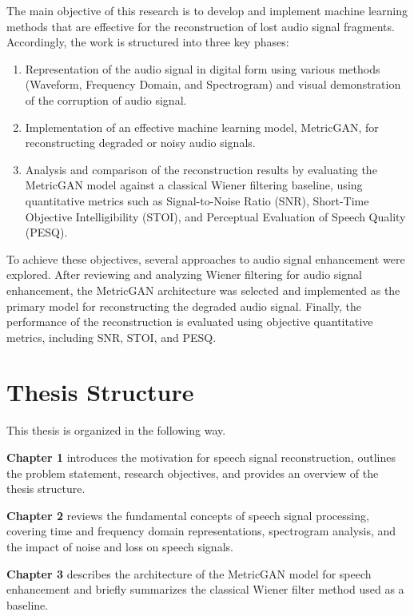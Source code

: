The main objective of this research is to develop and implement machine learning methods that are effective for the reconstruction of lost audio signal fragments.
Accordingly, the work is structured into three key phases:
\begin{enumerate}
    \item Representation of the audio signal in digital form using various methods (Waveform, Frequency Domain, and Spectrogram) and visual demonstration of the corruption of audio signal.

    \item Implementation of an effective machine learning model, MetricGAN, for reconstructing degraded or noisy audio signals.

    \item Analysis and comparison of the reconstruction results by evaluating the MetricGAN model against a classical Wiener filtering baseline, using quantitative metrics such as Signal-to-Noise Ratio (SNR), Short-Time Objective Intelligibility (STOI), and Perceptual Evaluation of Speech Quality (PESQ).
\end{enumerate}

To achieve these objectives, several approaches to audio signal enhancement were explored.  After reviewing and analyzing Wiener filtering for audio signal enhancement, the MetricGAN architecture was selected and implemented as the primary model for reconstructing the degraded audio signal. Finally, the performance of the reconstruction is evaluated using objective quantitative metrics, including SNR, STOI, and PESQ.

\section{Thesis Structure}

This thesis is organized in the following way. 

\textbf{Chapter 1} introduces the motivation for speech signal reconstruction, outlines the problem statement, research objectives, and provides an overview of the thesis structure. 

\textbf{Chapter 2} reviews the fundamental concepts of speech signal processing, covering time and frequency domain representations, spectrogram analysis, and the impact of noise and loss on speech signals. 

\textbf{Chapter 3} describes the architecture of the MetricGAN model for speech enhancement and briefly summarizes the classical Wiener filter method used as a baseline. 

